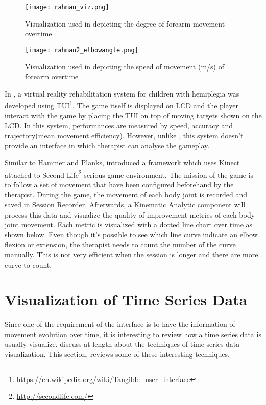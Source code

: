 \begin{figure}
\centering
\texttt{[image: rahman\_viz.png]}
\caption{Visualization used in \cite{rahman} depicting the degree of forearm movement overtime}
\end{figure}

\begin{figure}
\centering
\texttt{[image: rahman2\_elbowangle.png]}
\caption{Visualization used in \cite{rahman2} depicting the speed of movement (m/s) of forearm overtime}
\end{figure}

In \cite{green}, a virtual reality rehabilitation system for children with hemiplegia was developed using TUI\footnote{\url{https://en.wikipedia.org/wiki/Tangible_user_interface}}. The game itself is displayed on LCD and the player interact with the game by placing the TUI on top of moving targets shown on the LCD. In this system, performances are measured by speed, accuracy and trajectory(mean movement efficiency). However, unlike \cite{rahman}, this system doesn't provide an interface in which therapist can analyse the gameplay.

Similar to Hammer and Planks, \cite{rahman2} introduced a framework which uses Kinect attached to Second Life\footnote{\url{http://secondlife.com/}} serious game environment. The mission of the game is to follow a set of movement that have been configured beforehand by the therapist. During the game, the movement of each body joint  is recorded and saved in Session Recorder. Afterwards, a Kinematic Analytic component will process this data and visualize the quality of improvement metrics of each body joint movement. Each metric is visualized with a dotted line chart over time as shown below. Even though it's possible to  see which line curve indicate an elbow flexion or extension, the therapist needs to count the number of the curve manually. This is not very efficient when the session is longer and there are more curve to count.

\section{Visualization of Time Series Data}

Since one of the requirement of the interface is to have the information of movement evolution over time, it is interesting to review how a time series data is usually visualize. \cite{aigner} discuss at length about the techniques of time series data visualization. This section, reviews some of these interesting techniques.

